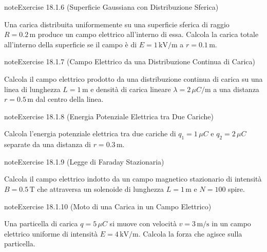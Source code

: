 \documentclass[letterpaper,10pt,italian]{jupyterBook}
\begin{document}
\begin{sphinxadmonition}{note}{Exercise 18.1.6 (Superficie Gaussiana con Distribuzione Sferica)}



\sphinxAtStartPar
Una carica distribuita uniformemente su una superficie sferica di raggio \(R = 0.2 \, \text{m}\) produce un campo elettrico all’interno di essa. Calcola la carica totale all’interno della superficie se il campo è di \(E = 1 \, \text{kV/m}\) a \(r = 0.1 \, \text{m}\).
\end{sphinxadmonition}
 \label{exercise:ch/electromagnetism/electrostatics-problems-exercise-6}

\begin{sphinxadmonition}{note}{Exercise 18.1.7 (Campo Elettrico da una Distribuzione Continua di Carica)}



\sphinxAtStartPar
Calcola il campo elettrico prodotto da una distribuzione continua di carica su una linea di lunghezza \(L = 1 \, \text{m}\) e densità di carica lineare \(\lambda = 2 \, \mu C/\text{m}\) a una distanza \(r = 0.5 \, \text{m}\) dal centro della linea.
\end{sphinxadmonition}
 \label{exercise:ch/electromagnetism/electrostatics-problems-exercise-7}

\begin{sphinxadmonition}{note}{Exercise 18.1.8 (Energia Potenziale Elettrica tra Due Cariche)}



\sphinxAtStartPar
Calcola l’energia potenziale elettrica tra due cariche di \(q_1 = 1 \, \mu C\) e \(q_2 = 2 \, \mu C\) separate da una distanza di \(r = 0.3 \, \text{m}\).
\end{sphinxadmonition}
 \label{exercise:ch/electromagnetism/electrostatics-problems-exercise-8}

\begin{sphinxadmonition}{note}{Exercise 18.1.9 (Legge di Faraday Stazionaria)}



\sphinxAtStartPar
Calcola il campo elettrico indotto da un campo magnetico stazionario di intensità \(B = 0.5 \, \text{T}\) che attraversa un solenoide di lunghezza \(L = 1 \, \text{m}\) e \(N = 100\) spire.
\end{sphinxadmonition}
 \label{exercise:ch/electromagnetism/electrostatics-problems-exercise-9}

\begin{sphinxadmonition}{note}{Exercise 18.1.10 (Moto di una Carica in un Campo Elettrico)}



\sphinxAtStartPar
Una particella di carica \(q = 5 \, \mu C\) si muove con velocità \(v = 3 \, \text{m/s}\) in un campo elettrico uniforme di intensità \(E = 4 \, \text{kV/m}\). Calcola la forza che agisce sulla particella.
\end{sphinxadmonition}
 \label{exercise:ch/electromagnetism/electrostatics-problems-exercise-10}
\end{document}
